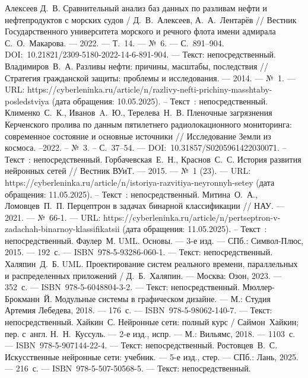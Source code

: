 
\begin{thebibliography}{99}

	  Алексеев Д.~В. Сравнительный анализ баз данных по разливам нефти и нефтепродуктов с морских судов / Д.~В.~Алексеев, А.~А.~Лентарёв // Вестник Государственного университета морского и речного флота имени адмирала С.~О.~Макарова. — 2022. — Т.~14. — №~6. — С.~891–904. DOI:~10.21821/2309-5180-2022-14-6-891-904. — Текст: непосредственный.
     Владимиров~В.~А. Разливы нефти: причины, масштабы, последствия // Стратегия гражданской защиты: проблемы и исследования. — 2014. — №~1. — URL: https://cyberleninka.ru/article/n/razlivy-nefti-prichiny-masshtaby-posledstviya (дата обращения: 10.05.2025). – Текст~: непосредственный.
     Клименко~С.~К., Иванов~A.~Ю., Терелева~Н.~В. Пленочные загрязнения Керченского пролива по данным пятилетнего радиолокационного мониторинга: современное состояние и основные источники // Исследование Земли из космоса. –2022. – №~3. – С.~37–54. — DOI:~10.31857/S0205961422030071. – Текст~: непосредственный.
    	Горбачевская~Е.~Н., Краснов~С.~С. История развития нейронных сетей  // Вестник ВУиТ.  — 2015. — №~1 (23). — URL: https://cyberleninka.ru/article/n/istoriya-razvitiya-neyronnyh-setey (дата обращения: 11.05.2025).  – Текст~: непосредственный.
	Митина~О.~А., Ломовцев~П.~П. Перцептрон в задачах бинарной классификации // НАУ. — 2021. — №~66-1. — URL: https://cyberleninka.ru/article/n/pertseptron-v-zadachah-binarnoy-klassifikatsii (дата обращения: 11.05.2025). – Текст~: непосредственный.
	 Фаулер~М. UML. Основы. --- 3-е изд. --- СПб.: Символ-Плюс, 2015. --- 192~с. --- ISBN~978-5-93286-060-1. --- Текст: непосредственный.
	 Халяпин~Д.~Б. UML. Проектирование систем реального времени, параллельных и распределенных приложений / Д.~Б.~Халяпин. --- Москва: Озон, 2023. --- 352~с. --- ISBN~978-5-6048804-3-2. --- Текст: непосредственный.
	 Мюллер-Брокманн~Й. Модульные системы в графическом дизайне. --- М.: Студия Артемия Лебедева, 2018. --- 176~с. --- ISBN~978-5-98062-140-7. --- Текст: непосредственный.
	 Хайкин~С. Нейронные сети: полный курс / Саймон~Хайкин; пер. с~англ. Н.~Н.~Куссуль. --- 2-е изд., испр. --- М.: Вильямс, 2018. --- 1103~с. --- ISBN~978-5-907144-22-4. --- Текст: непосредственный.
	 Ростовцев~В.~С. Искусственные нейронные сети: учебник. --- 5-е изд., стер. --- СПб.: Лань, 2025. --- 216~с. --- ISBN~978-5-507-50568-5. --- Текст: непосредственный.

\end{thebibliography}
